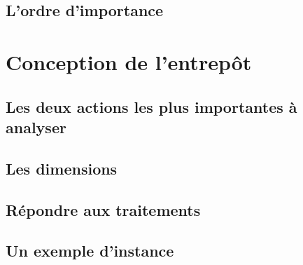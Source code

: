 \documentclass[11pt]{article}
\begin{document}
\subsection{L'ordre d'importance}

\section{Conception de l'entrepôt}
\subsection{Les deux actions les plus importantes à analyser}

\subsection{Les dimensions}

\subsection{Répondre aux traitements}

\subsection{Un exemple d'instance}
\end{document}

